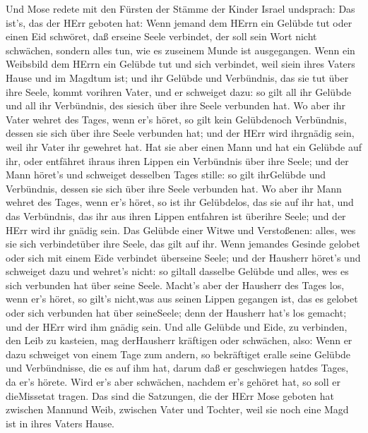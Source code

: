  Und Mose redete mit den Fürsten der Stämme der Kinder
Israel undsprach: Das ist's, das der HErr geboten hat:  Wenn
jemand dem HErrn ein Gelübde tut oder einen Eid schwöret, daß erseine
Seele verbindet, der soll sein Wort nicht schwächen, sondern alles tun,
wie es zuseinem Munde ist ausgegangen.  Wenn ein Weibsbild
dem HErrn ein Gelübde tut und sich verbindet, weil siein ihres Vaters
Hause und im Magdtum ist;  und ihr Gelübde und Verbündnis,
das sie tut über ihre Seele, kommt vorihren Vater, und er schweiget
dazu: so gilt all ihr Gelübde und all ihr Verbündnis, des siesich über
ihre Seele verbunden hat.  Wo aber ihr Vater wehret des
Tages, wenn er's höret, so gilt kein Gelübdenoch Verbündnis, dessen sie
sich über ihre Seele verbunden hat; und der HErr wird ihrgnädig sein,
weil ihr Vater ihr gewehret hat.  Hat sie aber einen Mann
und hat ein Gelübde auf ihr, oder entfähret ihraus ihren Lippen ein
Verbündnis über ihre Seele;  und der Mann höret's und
schweiget desselben Tages stille: so gilt ihrGelübde und Verbündnis,
dessen sie sich über ihre Seele verbunden hat.  Wo aber ihr
Mann wehret des Tages, wenn er's höret, so ist ihr Gelübdelos, das sie
auf ihr hat, und das Verbündnis, das ihr aus ihren Lippen entfahren ist
überihre Seele; und der HErr wird ihr gnädig sein.  Das
Gelübde einer Witwe und Verstoßenen: alles, wes sie sich verbindetüber
ihre Seele, das gilt auf ihr.  Wenn jemandes Gesinde
gelobet oder sich mit einem Eide verbindet überseine Seele;
 und der Hausherr höret's und schweiget dazu und wehret's
nicht: so giltall dasselbe Gelübde und alles, wes es sich verbunden hat
über seine Seele.  Macht's aber der Hausherr des Tages los,
wenn er's höret, so gilt's nicht,was aus seinen Lippen gegangen ist, das
es gelobet oder sich verbunden hat über seineSeele; denn der Hausherr
hat's los gemacht; und der HErr wird ihm gnädig sein.  Und
alle Gelübde und Eide, zu verbinden, den Leib zu kasteien, mag
derHausherr kräftigen oder schwächen, also:  Wenn er dazu
schweiget von einem Tage zum andern, so bekräftiget eralle seine Gelübde
und Verbündnisse, die es auf ihm hat, darum daß er geschwiegen hatdes
Tages, da er's hörete.  Wird er's aber schwächen, nachdem
er's gehöret hat, so soll er dieMissetat tragen.  Das sind
die Satzungen, die der HErr Mose geboten hat zwischen Mannund Weib,
zwischen Vater und Tochter, weil sie noch eine Magd ist in ihres Vaters
Hause.

